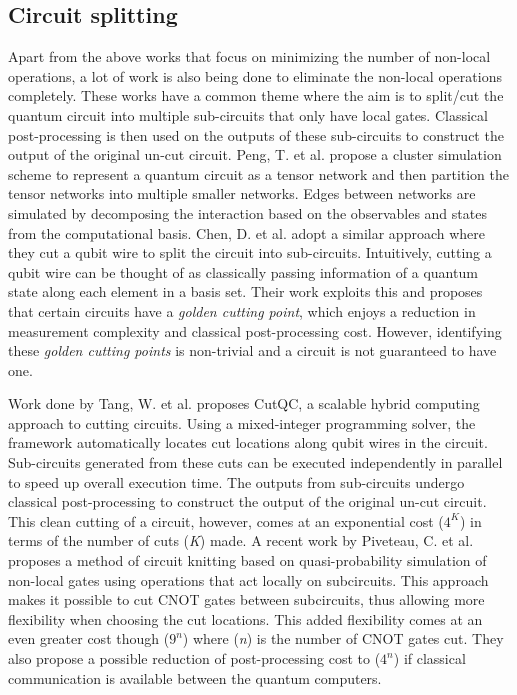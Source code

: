 \subsection{Circuit splitting}

Apart from the above works that focus on minimizing the number of non-local operations, a lot of work is also being done to eliminate the non-local operations completely. These works have a common theme where the aim is to split/cut the quantum circuit into multiple sub-circuits that only have local gates. Classical post-processing is then used on the outputs of these sub-circuits to construct the output of the original un-cut circuit. Peng, T. et al. \cite{peng2020simulating} propose a cluster simulation scheme to represent a quantum circuit as a tensor network and then partition the tensor networks into multiple smaller networks. Edges between networks are simulated by decomposing the interaction based on the observables and states from the computational basis. Chen, D. et al. \cite{chen2023efficient} adopt a similar approach where they cut a qubit wire to split the circuit into sub-circuits. Intuitively, cutting a qubit wire can be thought of as classically passing information of a quantum state along each element in a basis set. Their work exploits this and proposes that certain circuits have a \emph{golden cutting point}, which enjoys a reduction in measurement complexity and classical post-processing cost. However, identifying these \emph{golden cutting points} is non-trivial and a circuit is not guaranteed to have one. \par

Work done by Tang, W. et al. \cite{tang2021cutqc} proposes CutQC, a scalable hybrid computing approach to cutting circuits. Using a mixed-integer programming solver, the framework automatically locates cut locations along qubit wires in the circuit. Sub-circuits generated from these cuts can be executed independently in parallel to speed up overall execution time. The outputs from sub-circuits undergo classical post-processing to construct the output of the original un-cut circuit. This clean cutting of a circuit, however, comes at an exponential cost ($4^{K}$) in terms of the number of cuts (\emph{K}) made. A recent work by Piveteau, C. et al. \cite{piveteau2023circuit} proposes a method of circuit knitting based on quasi-probability simulation of non-local gates using operations that act locally on subcircuits. This approach makes it possible to cut CNOT gates between subcircuits, thus allowing more flexibility when choosing the cut locations. This added flexibility comes at an even greater cost though ($9^{n}$) where (\emph{n}) is the number of CNOT gates cut. They also propose a possible reduction of post-processing cost to ($4^{n}$) if classical communication is available between the quantum computers. \par

